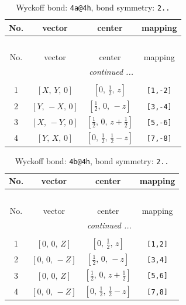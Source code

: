 \documentclass[fleqn,8pt]{jsarticle}
\begin{document}
\begin{longtable}{cccc}
\caption{Wyckoff bond: {\tt 4a@4h}, bond symmetry: {\tt 2..}}
 \\
 \hline \hline
No. & vector & center & mapping \\ \hline \endfirsthead

\multicolumn{3}{l}{\tablename\ \thetable{}} \\
 \hline \hline
No. & vector & center & mapping \\ \hline \endhead

 \hline \hline
\multicolumn{3}{r}{\footnotesize\it continued ...} \\ \endfoot

 \hline \hline
\multicolumn{3}{r}{} \\ \endlastfoot

1 & $\left[ X,\, Y,\, 0 \right]$ & $\left[ 0,\, \frac{1}{2},\, z \right]$ & {\tt [1,-2]} \\ \hline
2 & $\left[ Y,\, - X,\, 0 \right]$ & $\left[ \frac{1}{2},\, 0,\, - z \right]$ & {\tt [3,-4]} \\ \hline
3 & $\left[ X,\, - Y,\, 0 \right]$ & $\left[ \frac{1}{2},\, 0,\, z + \frac{1}{2} \right]$ & {\tt [5,-6]} \\ \hline
4 & $\left[ Y,\, X,\, 0 \right]$ & $\left[ 0,\, \frac{1}{2},\, \frac{1}{2} - z \right]$ & {\tt [7,-8]} \\
\end{longtable}
\renewcommand{\arraystretch}{1.2}
\begin{longtable}{cccc}
\caption{Wyckoff bond: {\tt 4b@4h}, bond symmetry: {\tt 2..}}
 \\
 \hline \hline
No. & vector & center & mapping \\ \hline \endfirsthead

\multicolumn{3}{l}{\tablename\ \thetable{}} \\
 \hline \hline
No. & vector & center & mapping \\ \hline \endhead

 \hline \hline
\multicolumn{3}{r}{\footnotesize\it continued ...} \\ \endfoot

 \hline \hline
\multicolumn{3}{r}{} \\ \endlastfoot

1 & $\left[ 0,\, 0,\, Z \right]$ & $\left[ 0,\, \frac{1}{2},\, z \right]$ & {\tt [1,2]} \\ \hline
2 & $\left[ 0,\, 0,\, - Z \right]$ & $\left[ \frac{1}{2},\, 0,\, - z \right]$ & {\tt [3,4]} \\ \hline
3 & $\left[ 0,\, 0,\, Z \right]$ & $\left[ \frac{1}{2},\, 0,\, z + \frac{1}{2} \right]$ & {\tt [5,6]} \\ \hline
4 & $\left[ 0,\, 0,\, - Z \right]$ & $\left[ 0,\, \frac{1}{2},\, \frac{1}{2} - z \right]$ & {\tt [7,8]} \\
\end{longtable}
\end{document}

